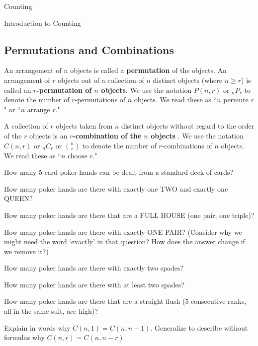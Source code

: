 \begin{chapter}{Counting}
\begin{section}{Introduction to Counting}
\section{Permutations and Combinations}
\begin{definition}
An arrangement of $n$ objects is called a {\bf permutation} of the objects. An arrangement of $r$ objects out of a collection of $n$ distinct objects (where $n \geq r$) is called an {\bf $r$-permutation of $n$ objects}. We use the notation $P(n,r)$ or $_nP_r$ to denote the number of $r$-permutations of $n$ objects. We read these as ``$n$ permute $r$" or ``$n$ arrange $r$."
\end{definition}
\begin{definition}
A collection of $r$ objects taken from $n$ distinct objects without regard to the order of the $r$ objects is an {\bf $r$-combination of the $n$ objects  }. We use the notation $C(n,r)$ or $_nC_r$ or $\binom{n}{r}$ to denote the number of $r$-combinations of $n$ objects. We read these as ``$n$ choose $r$."
\end{definition}
\begin{exercise}
How many 5-card poker hands can be dealt from a standard deck of cards?
\end{exercise}
\begin{exercise}
How many poker hands are there with exactly one TWO and exactly one QUEEN?
\end{exercise}
\begin{exercise}
How many poker hands are there that are a FULL HOUSE (one pair, one triple)?
\end{exercise}
\begin{exercise}
How many poker hands are there with exactly ONE PAIR? (Consider why we might need the word `exactly' in that question? How does the answer change if we remove it?)
\end{exercise}
\begin{exercise}
How many poker hands are there with exactly two spades?
\end{exercise}
\begin{exercise}
How many poker hands are there with at least two spades?
\end{exercise}
\begin{exercise}
How many poker hands are there that are a straight flush (5 consecutive ranks, all in the same suit, ace high)? 
\end{exercise}
\begin{problem}
Explain in words why $C(n,1)=C(n, n-1)$. Generalize to describe without formulas why $C(n,r) = C(n, n-r)$.

\end{problem}
\end{section}
\end{chapter}

